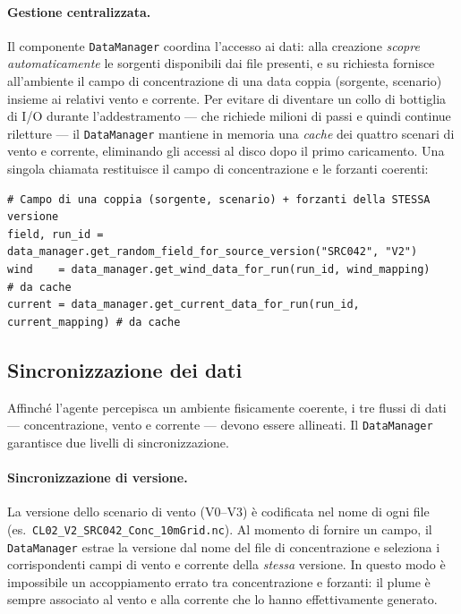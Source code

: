 \paragraph{Gestione centralizzata.}
Il componente \texttt{DataManager} coordina l'accesso ai dati: alla creazione
\emph{scopre automaticamente} le sorgenti disponibili dai file presenti, e su richiesta
fornisce all'ambiente il campo di concentrazione di una data coppia (sorgente, scenario)
insieme ai relativi vento e corrente. Per evitare di diventare un collo di bottiglia di
I/O durante l'addestramento --- che richiede milioni di passi e quindi continue
riletture --- il \texttt{DataManager} mantiene in memoria una \emph{cache} dei quattro
scenari di vento e corrente, eliminando gli accessi al disco dopo il primo caricamento.
Una singola chiamata restituisce il campo di concentrazione e le forzanti coerenti:

\begin{lstlisting}
# Campo di una coppia (sorgente, scenario) + forzanti della STESSA versione
field, run_id = data_manager.get_random_field_for_source_version("SRC042", "V2")
wind    = data_manager.get_wind_data_for_run(run_id, wind_mapping)       # da cache
current = data_manager.get_current_data_for_run(run_id, current_mapping) # da cache
\end{lstlisting}

\subsection{Sincronizzazione dei dati}
\label{sec:sync}

Affinch\'e l'agente percepisca un ambiente fisicamente coerente, i tre flussi di dati
--- concentrazione, vento e corrente --- devono essere allineati. Il \texttt{DataManager}
garantisce due livelli di sincronizzazione.

\paragraph{Sincronizzazione di versione.}
La versione dello scenario di vento (V0--V3) \`e codificata nel nome di ogni file (es.\
\texttt{CL02\_V2\_SRC042\_Conc\_10mGrid.nc}). Al momento di fornire un campo, il
\texttt{DataManager} estrae la versione dal nome del file di concentrazione e seleziona i
corrispondenti campi di vento e corrente della \emph{stessa} versione. In questo modo \`e
impossibile un accoppiamento errato tra concentrazione e forzanti: il plume \`e sempre
associato al vento e alla corrente che lo hanno effettivamente generato.

